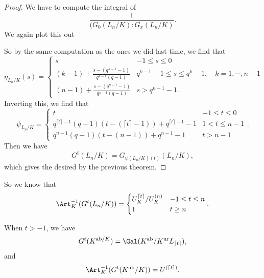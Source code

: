 \documentclass[a4paper]{article}
\begin{document}
\begin{proof}
  We have to compute the integral of
  \[
    \frac{1}{(G_0(L_n/K): G_x(L_n/K)}.
  \]
  We again plot this out
  \begin{center}
  \end{center}
  So by the same computation as the ones we did last time, we find that
  \[
    \eta_{L_n/K}(s) =
    \begin{cases}
      s & -1 \leq s \leq 0\\
      (k - 1) + \frac{s - (q^{k - 1} - 1)}{q^{k - 1}(q - 1)} & q^{k - 1} - 1 \leq s \leq q^k - 1, \quad k = 1, \cdots, n - 1\\
      (n - 1) + \frac{s - (q^{n - 1} - 1)}{q^{n - 1}(q - 1)} & s > q^{n - 1} - 1.
    \end{cases}
  \]
  Inverting this, we find that
  \[
    \psi_{L_n/K} =
    \begin{cases}
      t & -1 \leq t \leq 0\\
      q^{\lceil t \rceil - 1}(q - 1)(t - (\lceil t \rceil - 1)) + q^{\lceil t \rceil - 1} - 1 & 1 < t \leq n - 1\\
      q^{n - 1}(q - 1)(t - (n - 1)) + q^{n - 1} - 1 & t > n - 1
    \end{cases}.
  \]
  Then we have
  \[
    G^t(L_n/K) = G_{\psi(L_n/K)(t)} (L_n/K),
  \]
  which gives the desired by the previous theorem.
\end{proof}

So we know that
\[
  \Art_K^{-1}(G^t(L_n/K)) =
  \begin{cases}
    U_K^{\lceil t\rceil} / U_K^{(n)} & -1 \leq t \leq n\\
    1 & t \geq n
  \end{cases}.
\]

\begin{cor}
  When $t > -1$, we have
  \[
    G^t(K^{\mathrm{ab}/K}) = \Gal(K^{\mathrm{ab}}/K^{\mathrm{ur}}L_{\lceil t\rceil}),
  \]
  and
  \[
    \Art_K^{-1}(G^t(K^{\mathrm{ab}}/K)) = U^{(\lceil t\rceil)}.
  \]
\end{cor}
\end{document}
